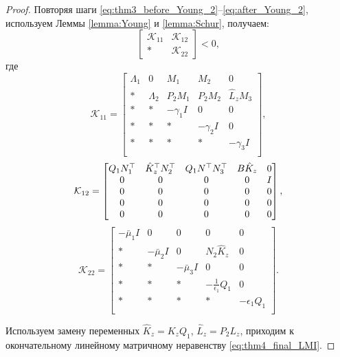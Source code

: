 \begin{proof}
Повторяя шаги \eqref{eq:thm3_before_Young_2}--\eqref{eq:after_Young_2}, 
используем Леммы \ref{lemma:Young} и \ref{lemma:Schur}, получаем:
\begin{equation}
	\label{eq:thm4_final_LMI_var}
	\begin{bmatrix}
		\mathcal{K}_{11} & \mathcal{K}_{12} \\
		* & \mathcal{K}_{22}
	\end{bmatrix}<0,
\end{equation}
где
\begin{equation}
	\mathcal{K}_{11}= \begin{bmatrix}
		{\Lambda}_1 & 0 & {M}_1 & {M}_2&0  \\
		* & {\Lambda}_2 & {P}_2{M}_1 & {P}_2{M}_2 & \hat{{L}}_z{M}_3\\
		* & * & -\gamma_1{I} & 0&0\\
		* & * &*  & -\gamma_2{I} &0\\
		*& * & * &*  &-\gamma_3{I}\\
	\end{bmatrix},
\end{equation}
%
\begin{equation}
	\mathcal{K}_{12}= \begin{bmatrix}
		{Q}_1{N}_1^\top & \hat{{K}}_z^\top{N}_2^\top & {Q}_1 {N}^\top{N}_3^\top & {B}\hat{{K}}_z & 0\\
		0&0&0&0&I\\
		0&0& 0&0&0\\
		0&0&0& 0&0\\
		0&0&0&0&0\\
	\end{bmatrix},
\end{equation}
%
\begin{equation}
	\mathcal{K}_{22}=
	\begin{bmatrix}
		-\bar{\mu}_1{I}&0&0&0&0 \\
		*&-\bar{\mu}_2{I}& 0&{N}_2\hat{{K}}_z&0\\
		* & *&-\bar{\mu}_3{I}&0&0\\
		* & *&*&-\frac{1}{\epsilon_1}{Q}_1&0\\
		*&*&*&*&-\epsilon_1{Q}_1\\
	\end{bmatrix}.
\end{equation}%

Используем замену переменных $\hat{{K}}_z={K}_z{Q}_1$, $\hat{{L}}_z={P}_2{L}_z$, приходим к окончательному линейному матричному неравенству \eqref{eq:thm4_final_LMI}.
\end{proof}
